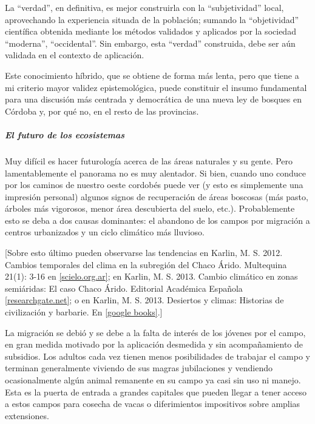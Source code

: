 \documentclass[
]{article}
\begin{document}
La ``verdad'', en definitiva, es mejor construirla con la
``subjetividad'' local, aprovechando la experiencia situada de la
población; sumando la ``objetividad'' científica obtenida mediante los
métodos validados y aplicados por la sociedad ``moderna'',
``occidental''. Sin embargo, esta ``verdad'' construida, debe ser aún
validada en el contexto de aplicación.

Este conocimiento híbrido, que se obtiene de forma más lenta, pero que
tiene a mi criterio mayor validez epistemológica, puede constituir el
insumo fundamental para una discusión más centrada y democrática de una
nueva ley de bosques en Córdoba y, por qué no, en el resto de las
provincias.

\hypertarget{el-futuro-de-los-ecosistemas}{%
\subparagraph{El futuro de los
ecosistemas}\label{el-futuro-de-los-ecosistemas}}

Muy difícil es hacer futurología acerca de las áreas naturales y su
gente. Pero lamentablemente el panorama no es muy alentador. Si bien,
cuando uno conduce por los caminos de nuestro oeste cordobés puede ver
(y esto es simplemente una impresión personal) algunos signos de
recuperación de áreas boscosas (más pasto, árboles más vigorosos, menor
área descubierta del suelo, etc.). Probablemente esto se deba a dos
causas dominantes: el abandono de los campos por migración a centros
urbanizados y un ciclo climático más lluvioso.

{[}Sobre esto último pueden observarse las tendencias en Karlin, M. S.
2012. Cambios temporales del clima en la subregión del Chaco Árido.
Multequina 21(1): 3-16 en
\href{http://www.scielo.org.ar/pdf/multeq/v21n1/v21n1a01.pdf}{{[}scielo.org.ar{]}};
en Karlin, M. S. 2013. Cambio climático en zonas semiáridas: El caso
Chaco Árido. Editorial Académica Española
\href{https://www.researchgate.net/publication/259389853_Cambio_climatico_en_zonas_semiaridas}{{[}researchgate.net{]}};
o en Karlin, M. S. 2013. Desiertos y climas: Historias de civilización y
barbarie. En
\href{http://books.googleusercontent.com/books/content?req=AKW5QafV9c3ichUs8R9_EA7dOvxkmUWsyacvgfB0JTjatnsjjtTRAjLtrT0eqARSSKt3EuBPNyEIkxip5Gw2DL1aqNsyhDNMT2V9TdP-f1GasABzoTRn-TZy6zk2TBseCTwtjRnoITNPsnMd8Q39JoRMQee2MGP0D17-Hw8WdsfNP0bvI3OLSYCCvL0gWI8hUlktj-G4oC75JEmXNXBDeNiAEuppRJn2DPXuU1qpSg42cG4ytUJmcDNlZr9OhvaszR7tUpvJ6XTG7WI28TOxsG4joYjRq8o3M3wYu2XOBtDMnuWOLTyaTPs}{{[}google
books{]}}.{]}

La migración se debió y se debe a la falta de interés de los jóvenes por
el campo, en gran medida motivado por la aplicación desmedida y sin
acompañamiento de subsidios. Los adultos cada vez tienen menos
posibilidades de trabajar el campo y terminan generalmente viviendo de
sus magras jubilaciones y vendiendo ocasionalmente algún animal
remanente en su campo ya casi sin uso ni manejo. Esta es la puerta de
entrada a grandes capitales que pueden llegar a tener acceso a estos
campos para cosecha de vacas o diferimientos impositivos sobre amplias
extensiones.
\end{document}
